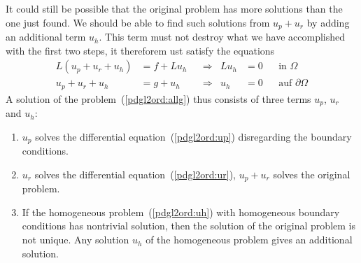 It could still be possible that the original problem has more solutions
than the one just found.
We should be able to find such solutions from $u_p+u_r$ by adding
an additional term $u_h$.
This term must not destroy what we have accomplished with the first
two steps,
it thereforem ust satisfy the equations
\begin{equation}
\begin{aligned}
L(u_p+u_r+u_h)&=f+Lu_h&&\Rightarrow&Lu_h&=0&&\text{in $\Omega$}\\
  u_p+u_r+u_h &=g +u_h&&\Rightarrow& u_h&=0&&\text{auf $\partial\Omega$}
\end{aligned}
\label{pdgl2ord:uh}
\end{equation}
A solution of the problem~(\ref{pdgl2ord:allg}) thus consists of three
terms $u_p$, $u_r$ and $u_h$:
\begin{enumerate}
\item
$u_p$ solves the differential equation~(\ref{pdgl2ord:up}) disregarding
the boundary conditions.
\item
$u_r$ solves the differential equation~(\ref{pdgl2ord:ur}),
$u_p+u_r$ solves the original problem.
\item
If the homogeneous problem~(\ref{pdgl2ord:uh}) with homogeneous
boundary conditions has nontrivial solution, then the solution
of the original problem is not unique.
Any solution $u_h$ of the homogeneous problem gives an additional
solution.
\end{enumerate}



